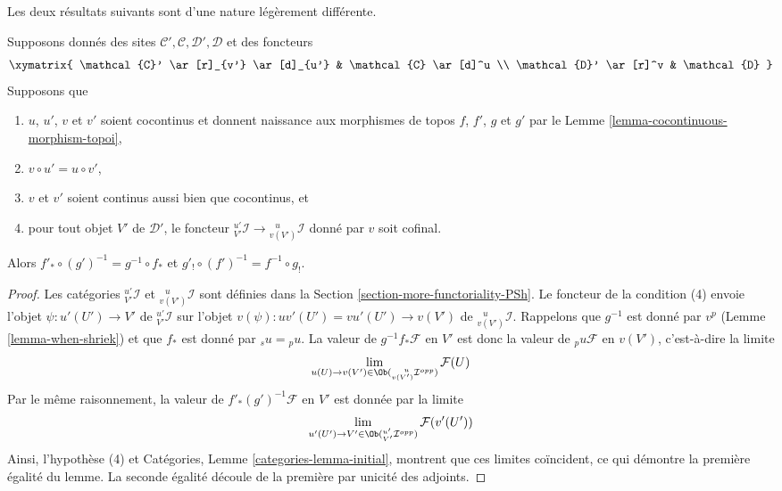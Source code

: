 \noindent
Les deux résultats suivants sont d’une nature légèrement différente.

\begin{lemma}
\label{lemma-special-square-cocontinuous}
Supposons donnés des sites $\mathcal{C}', \mathcal{C}, \mathcal{D}', \mathcal{D}$
et des foncteurs
$$
\xymatrix{
\mathcal{C}' \ar[r]_{v'} \ar[d]_{u'} &
\mathcal{C} \ar[d]^u \\
\mathcal{D}' \ar[r]^v &
\mathcal{D}
}
$$
Supposons que
\begin{enumerate}
\item $u$, $u'$, $v$ et $v'$ soient cocontinus et donnent naissance aux morphismes de
topos $f$, $f'$, $g$ et $g'$ par le Lemme \ref{lemma-cocontinuous-morphism-topoi},
\item $v \circ u' = u \circ v'$,
\item $v$ et $v'$ soient continus aussi bien que cocontinus, et
\item pour tout objet $V'$ de $\mathcal{D}'$, le foncteur
${}^{u'}_{V'}\mathcal{I} \to {}^{\ \ \ u}_{v(V')}\mathcal{I}$
donné par $v$ soit cofinal.
\end{enumerate}
Alors $f'_* \circ (g')^{-1} = g^{-1} \circ f_*$ et
$g'_! \circ (f')^{-1} = f^{-1} \circ g_!$.
\end{lemma}

\begin{proof}
Les catégories ${}^{u'}_{V'}\mathcal{I}$ et
${}^{\ \ \ u}_{v(V')}\mathcal{I}$ sont définies dans la
Section \ref{section-more-functoriality-PSh}.
Le foncteur de la condition (4) envoie l’objet
$\psi : u'(U') \to V'$ de ${}^{u'}_{V'}\mathcal{I}$ sur l’objet
$v(\psi) : uv'(U') = vu'(U') \to v(V')$ de ${}^{\ \ \ u}_{v(V')}\mathcal{I}$.
Rappelons que $g^{-1}$ est donné par $v^p$ (Lemme \ref{lemma-when-shriek}) et
que $f_*$ est donné par ${}_su = {}_pu$. La valeur de
$g^{-1}f_*\mathcal{F}$ en $V'$ est donc la valeur de ${}_pu\mathcal{F}$
en $v(V')$, c’est-à-dire la limite
$$
\lim_{u(U) \to v(V') \in \Ob({}^{\ \ \ u}_{v(V')}\mathcal{I}^{opp})}
\mathcal{F}(U)
$$
Par le même raisonnement, la valeur de $f'_*(g')^{-1}\mathcal{F}$
en $V'$ est donnée par la limite
$$
\lim_{u'(U') \to V' \in \Ob({}^{u'}_{V'}\mathcal{I}^{opp})} \mathcal{F}(v'(U'))
$$
Ainsi, l’hypothèse (4) et Catégories, Lemme \ref{categories-lemma-initial},
montrent que ces limites coïncident, ce qui démontre la première égalité du
lemme. La seconde égalité découle de la première par unicité des
adjoints.
\end{proof}

